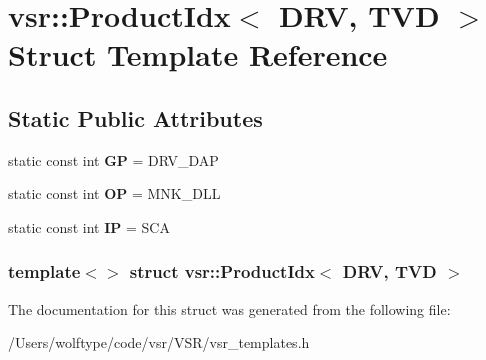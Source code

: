 \hypertarget{structvsr_1_1_product_idx_3_01_d_r_v_00_01_t_v_d_01_4}{\section{vsr\-:\-:Product\-Idx$<$ D\-R\-V, T\-V\-D $>$ Struct Template Reference}
\label{structvsr_1_1_product_idx_3_01_d_r_v_00_01_t_v_d_01_4}
}
\subsection*{Static Public Attributes}
\begin{DoxyCompactItemize}
\item 
\hypertarget{structvsr_1_1_product_idx_3_01_d_r_v_00_01_t_v_d_01_4_ae93f2b765e5b1e8cfc47c3a46f463385}{static const int {\bfseries G\-P} = D\-R\-V\-\_\-\-D\-A\-P}\label{structvsr_1_1_product_idx_3_01_d_r_v_00_01_t_v_d_01_4_ae93f2b765e5b1e8cfc47c3a46f463385}

\item 
\hypertarget{structvsr_1_1_product_idx_3_01_d_r_v_00_01_t_v_d_01_4_a0725750f06e9c766e608ea7512c05a4a}{static const int {\bfseries O\-P} = M\-N\-K\-\_\-\-D\-L\-L}\label{structvsr_1_1_product_idx_3_01_d_r_v_00_01_t_v_d_01_4_a0725750f06e9c766e608ea7512c05a4a}

\item 
\hypertarget{structvsr_1_1_product_idx_3_01_d_r_v_00_01_t_v_d_01_4_a8c87fc3450f634cd80035438fef6ad1c}{static const int {\bfseries I\-P} = S\-C\-A}\label{structvsr_1_1_product_idx_3_01_d_r_v_00_01_t_v_d_01_4_a8c87fc3450f634cd80035438fef6ad1c}

\end{DoxyCompactItemize}
\subsubsection*{template$<$$>$ struct vsr\-::\-Product\-Idx$<$ D\-R\-V, T\-V\-D $>$}



The documentation for this struct was generated from the following file\-:\begin{DoxyCompactItemize}
\item 
/\-Users/wolftype/code/vsr/\-V\-S\-R/vsr\-\_\-templates.\-h\end{DoxyCompactItemize}
